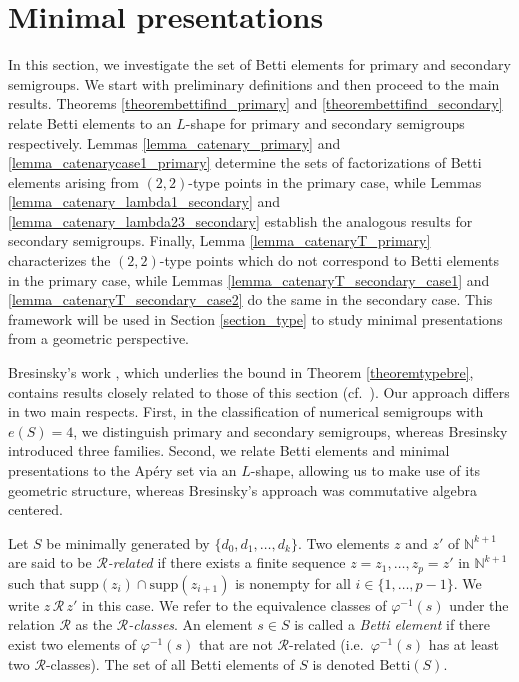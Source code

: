 \documentclass[12pt]{article}
\theoremstyle{remark}
\begin{document}
\section{Minimal presentations}\label{section_minimal_presentations}

In this section, we investigate the set of Betti elements for primary and secondary semigroups. We start with preliminary definitions and then proceed to the main results. Theorems \ref{theorembettifind_primary} and \ref{theorembettifind_secondary} relate Betti elements to an $L$-shape for primary and secondary semigroups respectively. Lemmas \ref{lemma_catenary_primary} and \ref{lemma_catenarycase1_primary} determine the sets of factorizations of Betti elements arising from $(2,2)$-type points in the primary case, while Lemmas \ref{lemma_catenary_lambda1_secondary} and \ref{lemma_catenary_lambda23_secondary} establish the analogous results for secondary semigroups. Finally, Lemma \ref{lemma_catenaryT_primary} characterizes the $(2,2)$-type points which do not correspond to Betti elements in the primary case, while Lemmas \ref{lemma_catenaryT_secondary_case1} and \ref{lemma_catenaryT_secondary_case2} do the same in the secondary case. This framework will be used in Section \ref{section_type} to study minimal presentations from a geometric perspective.

Bresinsky’s work \cite{Bresinsky1988}, which underlies the bound in Theorem \ref{theoremtypebre}, contains results closely related to those of this section (cf.\ \cite[Theorem 3]{Bresinsky1988}). Our approach differs in two main respects. First, in the classification of numerical semigroups with $e(S)=4$, we distinguish primary and secondary semigroups, whereas Bresinsky introduced three families. Second, we relate Betti elements and minimal presentations to the Ap{\'e}ry set via an $L$-shape, allowing us to make use of its geometric structure, whereas Bresinsky's approach was commutative algebra centered.



Let $S$ be minimally generated by $\{d_0,d_1,\dots,d_k\}$.
Two elements $z$ and $z'$ of $\mathbb{N}^{k+1}$ are said to be \emph{$\mathcal{R}$-related} if there exists a finite sequence $z = z_1, \dots, z_p = z'$ in $\mathbb{N}^{k+1}$ such that $\text{supp}(z_i) \cap \text{supp}(z_{i+1})$ is nonempty for all $i \in \{1, \dots, p-1\}$. We write $z \, \mathcal{R} \, z'$ in this case. We refer to the equivalence classes of $\varphi^{-1}(s)$ under the relation $\mathcal{R}$ as the \emph{$\mathcal{R}$-classes}. 
An element $s \in S$ is called a \emph{Betti element} if there exist two elements of $\varphi^{-1}(s)$ that are not $\mathcal{R}$-related (i.e.\ $\varphi^{-1}(s)$ has at least two $\mathcal{R}$-classes). The set of all Betti elements of $S$ is denoted $\text{Betti}(S)$.
\end{document}
